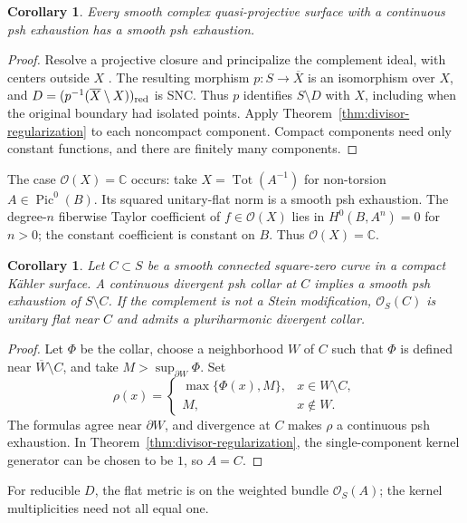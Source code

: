 \documentclass[11pt]{amsart}
\newtheorem{corollary}[theorem]{Corollary}
\theoremstyle{definition}
\theoremstyle{remark}
\numberwithin{equation}{section}
\newcommand{\C}{\mathbb C}
\newcommand{\OO}{\mathcal O}
\newcommand{\Tot}{\operatorname{Tot}}
\begin{document}
\begin{corollary}\label{cor:quasiprojective-regularization}
Every smooth complex quasi-projective surface with a continuous
psh exhaustion has a smooth psh exhaustion.
\end{corollary}
\begin{proof}
Resolve a projective closure and principalize the complement ideal,
with centers outside $X$ \cite[Theorems~1.0.1--1.0.2]{Wlodarczyk05}.
The resulting morphism $p:S\to\overline X$ is an isomorphism over
$X$, and $D=(p^{-1}(\overline X\setminus X))_{\rm red}$ is SNC.
Thus $p$ identifies $S\setminus D$ with $X$, including when the
original boundary had isolated points. Apply
Theorem~\ref{thm:divisor-regularization} to each noncompact component.
Compact components need only constant functions, and there are
finitely many components.
\end{proof}

The case $\OO(X)=\C$ occurs: take $X=\Tot(A^{-1})$ for non-torsion
$A\in\operatorname{Pic}^0(B)$. Its squared unitary-flat norm is a
smooth psh exhaustion. The degree-$n$ fiberwise Taylor coefficient
of $f\in\OO(X)$ lies in $H^0(B,A^n)=0$ for $n>0$; the constant
coefficient is constant on $B$. Thus $\OO(X)=\C$.

\begin{corollary}\label{cor:square-zero-continuous-collar}
Let $C\subset S$ be a smooth connected square-zero curve in a compact
K\"ahler surface. A continuous divergent psh collar at $C$ implies
a smooth psh exhaustion of $S\setminus C$. If the complement is not
a Stein modification, $\OO_S(C)$ is unitary flat near $C$ and admits
a pluriharmonic divergent collar.
\end{corollary}
\begin{proof}
Let $\Phi$ be the collar, choose a neighborhood $W$ of $C$ such that
$\Phi$ is defined near $\overline W\setminus C$,
and take $M>\sup_{\partial W}\Phi$. Set
\[
 \rho(x)=
 \begin{cases}\max\{\Phi(x),M\},&x\in W\setminus C,\\
 M,&x\notin W.
 \end{cases}
\]
The formulas agree near $\partial W$, and divergence at $C$ makes
$\rho$ a continuous psh exhaustion. In
Theorem~\ref{thm:divisor-regularization}, the single-component kernel
generator can be chosen to be $1$, so $A=C$.
\end{proof}

For reducible $D$, the flat metric is on the weighted bundle
$\OO_S(A)$; the kernel multiplicities need not all equal one.
\end{document}
